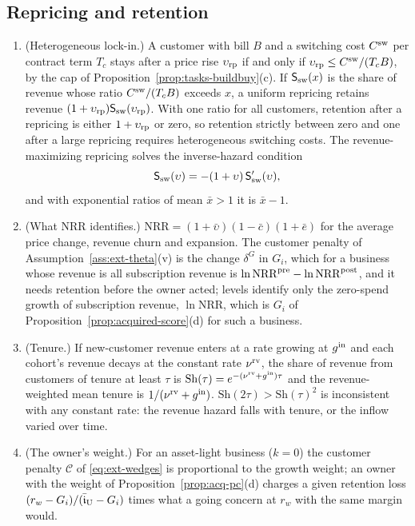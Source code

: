 \subsection{Repricing and retention}\label{sec:acq-retention}

\begin{proposition}\label{prop:acq-retention}
\begin{enumerate}
\item[(a)] (Heterogeneous lock-in.) A customer with bill $B$ and a switching cost $C^{\rm sw}$ per contract term $T_c$ stays after a price rise $\upsilon_{\rm rp}$ if and only if $\upsilon_{\rm rp}\le C^{\rm sw}/(T_cB)$, by the cap of Proposition~\ref{prop:tasks-buildbuy}(c). If $\mathsf S_{\rm sw}(x)$ is the share of revenue whose ratio $C^{\rm sw}/(T_cB)$ exceeds $x$, a uniform repricing retains revenue $(1+\upsilon_{\rm rp})\mathsf S_{\rm sw}(\upsilon_{\rm rp})$. With one ratio for all customers, retention after a repricing is either $1+\upsilon_{\rm rp}$ or zero, so retention strictly between zero and one after a large repricing requires heterogeneous switching costs. The revenue-maximizing repricing solves the inverse-hazard condition
\begin{equation}\label{eq:acq-reprice}
\mathsf S_{\rm sw}(\upsilon)=-(1+\upsilon)\,\mathsf S'_{\rm sw}(\upsilon),
\end{equation}
and with exponential ratios of mean $\bar x>1$ it is $\bar x-1$.
\item[(b)] (What NRR identifies.) $\mathrm{NRR}=(1+\bar\upsilon)(1-\bar c)(1+\bar e)$ for the average price change, revenue churn and expansion. The customer penalty of Assumption~\ref{ass:ext-theta}(v) is the change $\delta^G$ in $G_i$, which for a business whose revenue is all subscription revenue is $\ln\mathrm{NRR}^{\rm pre}-\ln\mathrm{NRR}^{\rm post}$, and it needs retention before the owner acted; levels identify only the zero-spend growth of subscription revenue, $\ln\mathrm{NRR}$, which is $G_i$ of Proposition~\ref{prop:acquired-score}(d) for such a business.
\item[(c)] (Tenure.) If new-customer revenue enters at a rate growing at $g^{\rm in}$ and each cohort's revenue decays at the constant rate $\nu^{\rm rv}$, the share of revenue from customers of tenure at least $\tau$ is $\mathrm{Sh}(\tau)=e^{-(\nu^{\rm rv}+g^{\rm in})\tau}$ and the revenue-weighted mean tenure is $1/(\nu^{\rm rv}+g^{\rm in})$. $\mathrm{Sh}(2\tau)>\mathrm{Sh}(\tau)^2$ is inconsistent with any constant rate: the revenue hazard falls with tenure, or the inflow varied over time.
\item[(d)] (The owner's weight.) For an asset-light business ($k=0$) the customer penalty $\mathcal C$ of \eqref{eq:ext-wedges} is proportional to the growth weight; an owner with the weight of Proposition~\ref{prop:acq-pc}(d) charges a given retention loss $(r_w-G_i)/(\bar{\mathfrak i}_{\rm U}-G_i)$ times what a going concern at $r_w$ with the same margin would.
\end{enumerate}
\end{proposition}

